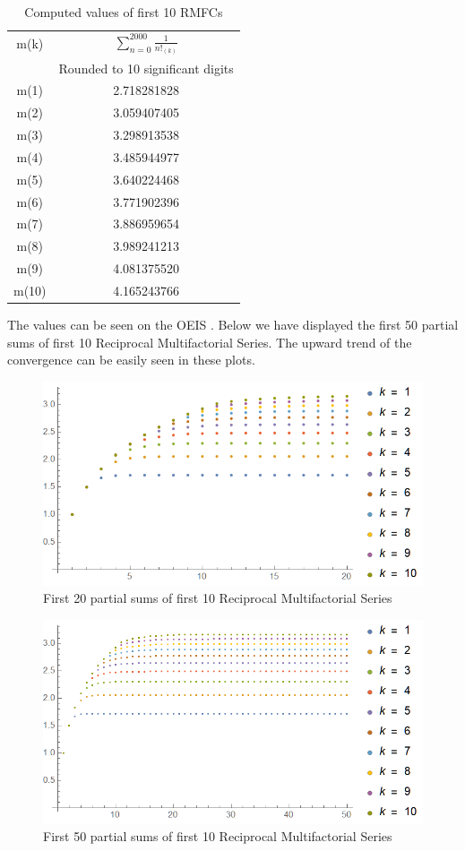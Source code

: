 \documentclass[12pt]{article}
\numberwithin{equation}{section}
\begin{document}
\begin{table}[h!]
\centering
\begin{tabular}{@{}cc@{}}
\toprule
m(k) & $\sum_{n=0}^{2000}\frac{1}{n!_{(k)}}$  \\ & Rounded to 10 significant digits \\ \midrule
m(1) & 2.718281828 \\
m(2) & 3.059407405 \\
m(3) & 3.298913538 \\
m(4) & 3.485944977 \\
m(5) & 3.640224468 \\
m(6) & 3.771902396 \\
m(7) & 3.886959654 \\
m(8) & 3.989241213 \\
m(9) & 4.081375520 \\
m(10) & 4.165243766 \\ \bottomrule
\end{tabular}
\caption{ Computed values of first 10 RMFCs}
\label{tab:summationvalues}
\end{table}\par
The values can be seen on the OEIS \cite{oeis}. Below we have displayed the first 50 partial sums of first 10 Reciprocal Multifactorial Series. The upward trend of the convergence can be easily seen in these plots.
\begin{figure}[!hbp]
    \centering
    \includegraphics[width=13cm]{Images/20partialsums.png}
    \caption{First 20 partial sums of first 10 Reciprocal Multifactorial Series}
    \label{fig:20partialsums}
\end{figure}
\begin{figure}[!htp]
    \centering
    \includegraphics[width=13cm]{Images/Plotofm1tom10.png}
    \caption{First 50 partial sums of first 10 Reciprocal Multifactorial Series}
    \label{fig:50partialsums}
\end{figure}
\clearpage
\end{document}
